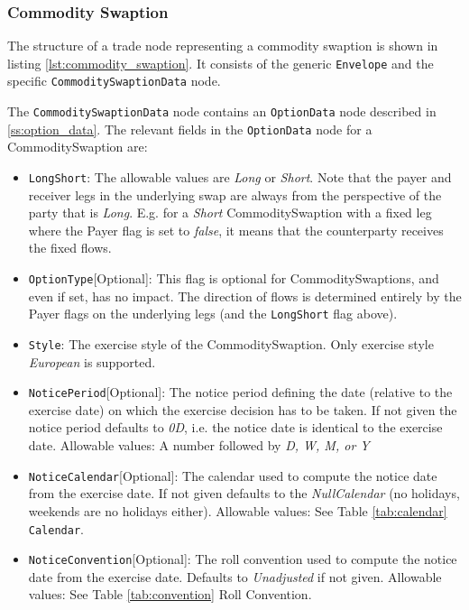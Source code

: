 \subsubsection{Commodity Swaption}
\label{ss:input_commodityswaption}

The structure of a trade node representing a commodity swaption is shown in listing \ref{lst:commodity_swaption}. It consists of the generic \lstinline!Envelope! and the specific \lstinline!CommoditySwaptionData! node.

The \lstinline!CommoditySwaptionData! node contains an \lstinline!OptionData! node described in \ref{ss:option_data}. The relevant fields in the \lstinline!OptionData! node for a CommoditySwaption are:

\begin{itemize}
\item \lstinline!LongShort!: The allowable values are \emph{Long} or \emph{Short}. Note that the payer and receiver legs in the underlying swap are always from the perspective of the party that is \emph{Long}. E.g. for a \emph{Short} CommoditySwaption with a fixed leg where the Payer flag is set to \emph{false}, it means that the counterparty receives the fixed flows.  


\item \lstinline!OptionType![Optional]: This flag is optional for CommoditySwaptions, and even if set, has no impact. The direction of flows is determined entirely by the Payer flags on the underlying legs (and the \lstinline!LongShort! flag above).

\item  \lstinline!Style!: The exercise style of the CommoditySwaption. Only exercise style \emph{European} is supported.

\item \lstinline!NoticePeriod![Optional]: The notice period defining the date (relative to the exercise date) on which the exercise
  decision has to be taken. If not given the notice period defaults to \emph{0D}, i.e. the notice date is identical to the
  exercise date. Allowable values: A number followed by \emph{D, W, M, or Y}

\item \lstinline!NoticeCalendar![Optional]: The calendar used to compute the notice date from the exercise date. If not given
  defaults to the \emph{NullCalendar} (no holidays, weekends are no holidays either). Allowable values: See Table \ref{tab:calendar} \lstinline!Calendar!.

\item \lstinline!NoticeConvention![Optional]: The roll convention used to compute the notice date from the exercise date. Defaults to
  \emph{Unadjusted} if not given. Allowable values: See Table \ref{tab:convention} Roll Convention.


\end{itemize}
